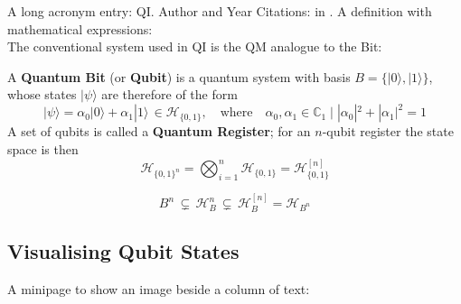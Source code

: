 \documentclass[a4paper,12pt]{article}
\begin{document}
A long acronym entry: \acrlong{QI}.
Author and Year Citations: \citeauthor{Shannon1948} in \citeyear{Shannon1948}.
A definition with mathematical expressions:\\


The conventional system used in \gls{QI} is the \gls{QM} analogue to the Bit:
\begin{defn}\label{def:Q_Reg}
    A \textbf{Quantum Bit} (or \textbf{Qubit}) is a quantum system with basis $B = \{|0\rangle,|1\rangle\}$, whose states $|\psi\rangle$ are therefore of the form
    $$
        |\psi\rangle = \alpha_{0}|0\rangle + \alpha_{1}|1\rangle \, \in \mathcal{H}_{\{0,1\}}, \quad \text{where} \quad
        \alpha_{0}, \alpha_{1} \in \mathbb{C}_{1} \; \big| \; |\alpha_{0}|^{2} + |\alpha_{1}|^{2} = 1
    $$
    A set of qubits is called a \textbf{Quantum Register}; for an $n$-qubit register the state space is then
    $$
        \mathcal{H}_{\{0,1\}^{n}} = \bigotimes_{i=1}^{n} \mathcal{H}_{\{0,1\}} = \mathcal{H}_{\{0,1\}}^{[n]}
    $$
\end{defn}


\begin{equation}\label{eq:CompositeInclusions}
    B^{n} \, \subsetneq \,
    \mathcal{H}_{B}^{n} \, \subsetneq \,
    \mathcal{H}_{B}^{[n]} = \mathcal{H}_{B^{n}}
\end{equation}



\subsection{Visualising Qubit States}
\label{sec:SubVisualStates}

A minipage to show an image beside a column of text:\\
\end{document}
